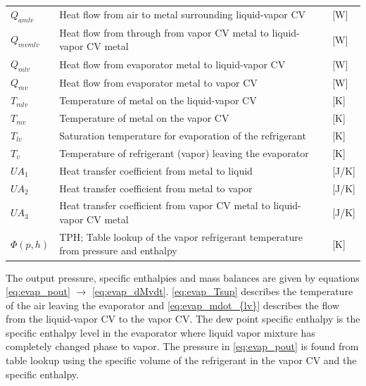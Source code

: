 \begin{center}
	\begin{tabular}{l p{10cm} l}
		$Q_{amlv}$  & Heat flow from air to metal surrounding liquid-vapor CV                           & [\si{W}]        \\
		$Q_{mvmlv}$ & Heat flow from through from vapor CV metal to liquid-vapor CV metal               & [\si{W}]        \\
		$Q_{mlv}$   & Heat flow from evaporator metal to liquid-vapor CV                                & [\si{W}]        \\
		$Q_{mv}$    & Heat flow from evaporator metal to vapor CV                                       & [\si{W}]        \\
		$T_{mlv}$   & Temperature of metal on the liquid-vapor CV                                       & [\si{K}]        \\
		$T_{mv}$    & Temperature of metal on the vapor CV                                              & [\si{K}]        \\
		$T_{lv}$    & Saturation temperature for evaporation of the refrigerant                         & [\si{K}]        \\
		$T_{v}$     & Temperature of refrigerant (vapor) leaving the evaporator                         & [\si{K}]        \\
		$UA_1$      & Heat transfer coefficient from metal to liquid                                    & [\si{J}/\si{K}] \\
		$UA_2$      & Heat transfer coefficient from metal to vapor                                     & [\si{J}/\si{K}] \\
		$UA_3$      & Heat transfer coefficient from vapor CV metal to liquid-vapor CV metal            & [\si{J}/\si{K}] \\
		$\Phi(p,h)$ & TPH; Table lookup of the vapor refrigerant temperature from pressure and enthalpy & [\si{K}]
	\end{tabular}
\end{center}

\medskip
The output pressure, specific enthalpies and mass balances are given by equations \cref{eq:evap_pout} $\rightarrow$ \cref{eq:evap_dMvdt}. \cref{eq:evap_Tsup} describes the temperature of the air leaving the evaporator and \cref{eq:evap_mdot_{lv}} describes the flow from the liquid-vapor CV to the vapor CV. The dew point specific enthalpy is the specific enthalpy level in the evaporator where liquid vapor mixture has completely changed phase to vapor. The pressure in \cref{eq:evap_pout} is found from table lookup using the specific volume of the refrigerant in the vapor CV and the specific enthalpy.

